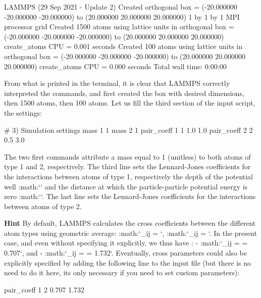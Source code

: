 \begin{lcverbatim}
LAMMPS (29 Sep 2021 - Update 2)
Created orthogonal box = (-20.000000 -20.000000 -20.000000) to (20.000000 20.000000 20.000000)
1 by 1 by 1 MPI processor grid
Created 1500 atoms
using lattice units in orthogonal box = (-20.000000 -20.000000 -20.000000) to (20.000000 20.000000 20.000000)
create_atoms CPU = 0.001 seconds
Created 100 atoms
using lattice units in orthogonal box = (-20.000000 -20.000000 -20.000000) to (20.000000 20.000000 20.000000)
create_atoms CPU = 0.000 seconds
Total wall time: 0:00:00
\end{lcverbatim}

From what is printed in the terminal, it is clear that
LAMMPS correctly interpreted the commands, and first created
the box with desired dimensions, then 1500 atoms, then 100
atoms.
Let us fill the third section of the input script, the settings:



\begin{lcverbatim}
# 3) Simulation settings
mass 1 1
mass 2 1
pair_coeff 1 1 1.0 1.0
pair_coeff 2 2 0.5 3.0
\end{lcverbatim}

The two first commands attribute a mass
equal to 1 (unitless) to both atoms of type 1 and 2,
respectively. The third line sets the Lennard-Jones
coefficients for the interactions between atoms of type 1,
respectively the depth of the potential well
:math:`\epsilon` and the distance at which the
particle-particle potential energy is zero :math:`\sigma`. 
The last line sets the Lennard-Jones coefficients for
the interactions between atoms of type 2.


\textbf{Hint} By default, LAMMPS calculates the cross coefficients between the different atom types
using geometric average: 
:math:`\epsilon_{ij} = `,
:math:`\sigma_{ij} = `. 
In the present case, and even without specifying it explicitly, we thus have :
- :math:`\epsilon_{ij} =  = 0.707`, and 
- :math:`\sigma_{ij} =  = 1.732`.
Eventually, cross parameters could also be explicitly specified by adding the following 
line to the input file (but there is no need to do it here, its only necessary if you need 
to set custom parameters):
\begin{lcverbatim}

pair_coeff 1 2 0.707 1.732 
\end{lcverbatim}


